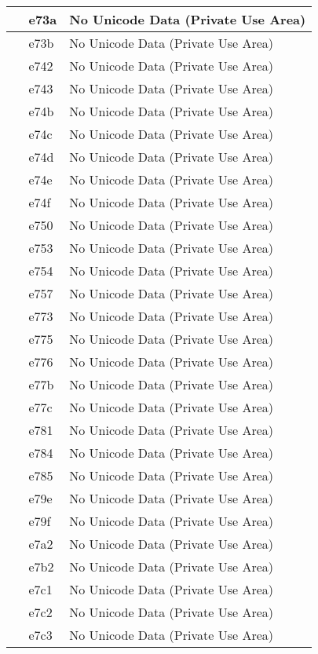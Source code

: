 \documentclass[12pt,letterpaper,openany]{book}
\begin{document}
\begin{center}
\begin{supertabular}{|m{0.25in}|m{0.5in}|m{4in}|}
 & e73a & No Unicode Data (Private Use Area)\\\hline
 & e73b & No Unicode Data (Private Use Area)\\\hline
 & e742 & No Unicode Data (Private Use Area)\\\hline
 & e743 & No Unicode Data (Private Use Area)\\\hline
 & e74b & No Unicode Data (Private Use Area)\\\hline
 & e74c & No Unicode Data (Private Use Area)\\\hline
 & e74d & No Unicode Data (Private Use Area)\\\hline
 & e74e & No Unicode Data (Private Use Area)\\\hline
 & e74f & No Unicode Data (Private Use Area)\\\hline
 & e750 & No Unicode Data (Private Use Area)\\\hline
 & e753 & No Unicode Data (Private Use Area)\\\hline
 & e754 & No Unicode Data (Private Use Area)\\\hline
 & e757 & No Unicode Data (Private Use Area)\\\hline
 & e773 & No Unicode Data (Private Use Area)\\\hline
 & e775 & No Unicode Data (Private Use Area)\\\hline
 & e776 & No Unicode Data (Private Use Area)\\\hline
 & e77b & No Unicode Data (Private Use Area)\\\hline
 & e77c & No Unicode Data (Private Use Area)\\\hline
 & e781 & No Unicode Data (Private Use Area)\\\hline
 & e784 & No Unicode Data (Private Use Area)\\\hline
 & e785 & No Unicode Data (Private Use Area)\\\hline
 & e79e & No Unicode Data (Private Use Area)\\\hline
 & e79f & No Unicode Data (Private Use Area)\\\hline
 & e7a2 & No Unicode Data (Private Use Area)\\\hline
 & e7b2 & No Unicode Data (Private Use Area)\\\hline
 & e7c1 & No Unicode Data (Private Use Area)\\\hline
 & e7c2 & No Unicode Data (Private Use Area)\\\hline
 & e7c3 & No Unicode Data (Private Use Area)\\\hline

\end{supertabular}
\end{center}
\end{document}
